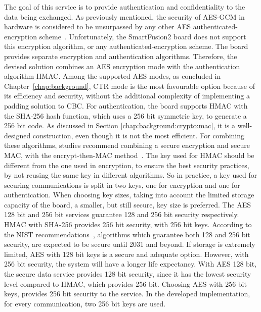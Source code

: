 The goal of this service is to provide authentication and confidentiality to the data being exchanged.
As previously mentioned, the security of AES-GCM in hardware is considered to be unsurpassed by any other AES authenticated-encryption scheme~\cite{aesmodes}.
Unfortunately, the SmartFusion2 board does not support this encryption algorithm, or any authenticated-encryption scheme. The board provides separate encryption and authentication algorithms.
Therefore, the devised solution combines an AES encryption mode with the authentication algorithm HMAC. Among the supported AES modes, as concluded in Chapter~\ref{chap:background}, CTR mode is the most favourable option because of its efficiency and security, without the additional complexity of implementing a padding solution to CBC.
For authentication, the board supports HMAC with the SHA-256 hash function, which uses a 256 bit symmetric key, to generate a 256 bit code. As discussed in Section \ref{chap:background:crypto:mac}, it is a well-designed construction, even though it is not the most efficient.
For combining these algorithms, studies recommend combining a secure encryption and secure MAC, with the encrypt-then-MAC method~\cite{encryptmacorder}.
The key used for HMAC should be different from the one used in encryption, to ensure the best security practices, by not reusing the same key in different algorithms. So in practice, a key used for securing communications is split in two keys, one for encryption and one for authentication.
When choosing key sizes, taking into account the limited storage capacity of the board, a smaller, but still secure, key size is preferred. The AES 128 bit and 256 bit services guarantee 128 and 256 bit security respectively. HMAC with SHA-256 provides 256 bit security, with 256 bit keys. According to the NIST recommendations~\cite{nistRecommendations}, algorithms which guarantee both 128 and 256 bit security, are expected to be secure until 2031 and beyond. If storage is extremely limited, AES with 128 bit keys is a secure and adequate option. However, with 256 bit security, the system will have a longer life expectancy.
With AES 128 bit, the secure data service provides 128 bit security, since it has the lowest security level compared to HMAC, which provides 256 bit. Choosing AES with 256 bit keys, provides 256 bit security to the service.
In the developed implementation, for every communication, two 256 bit keys are used.

